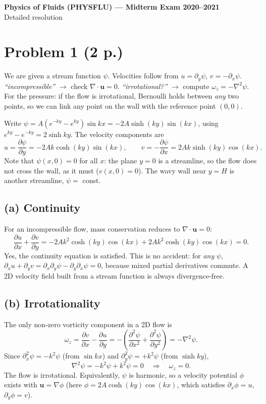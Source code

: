 \documentclass[11pt]{article}
\newcommand{\pd}{\partial}
\newcommand{\bu}{\mathbf u}
\newcommand{\kw}[1]{{\color{kw}\itshape ``#1''}}
\begin{document}
\begin{center}
{\color{hd}\Large\bfseries Physics of Fluids (PHYSFLU) --- Midterm Exam 2020--2021}\\[3pt]
Detailed resolution
\end{center}

\section*{Problem 1 \normalsize(2 p.)}

\begin{strategy}
We are given a stream function $\psi$. Velocities follow from $u=\pd_y\psi$, $v=-\pd_x\psi$.
\kw{incompressible} $\to$ check $\nabla\!\cdot\bu=0$. \kw{irrotational?} $\to$ compute $\omega_z=-\nabla^2\psi$.
For the pressure: if the flow is irrotational, Bernoulli holds between \emph{any} two points, so we can link any point on the wall with the reference point $(0,0)$.
\end{strategy}

Write $\psi=A\left(e^{-ky}-e^{ky}\right)\sin kx=-2A\sinh(ky)\sin(kx)$, using $e^{ky}-e^{-ky}=2\sinh ky$. The velocity components are
\[
u=\frac{\pd\psi}{\pd y}=-2Ak\cosh(ky)\sin(kx),\qquad
v=-\frac{\pd\psi}{\pd x}=2Ak\sinh(ky)\cos(kx).
\]
Note that $\psi(x,0)=0$ for all $x$: the plane $y=0$ is a streamline, so the flow does not cross the wall, as it must ($v(x,0)=0$). The wavy wall near $y=H$ is another streamline, $\psi=$ const.

\subsection*{(a) Continuity}
For an incompressible flow, mass conservation reduces to $\nabla\!\cdot\bu=0$:
\[
\frac{\pd u}{\pd x}+\frac{\pd v}{\pd y}
=-2Ak^2\cosh(ky)\cos(kx)+2Ak^2\cosh(ky)\cos(kx)=0 .
\]
Yes, the continuity equation is satisfied. This is no accident: for \emph{any} $\psi$, $\pd_xu+\pd_yv=\pd_x\pd_y\psi-\pd_y\pd_x\psi=0$, because mixed partial derivatives commute. A 2D velocity field built from a stream function is always divergence-free.

\subsection*{(b) Irrotationality}
The only non-zero vorticity component in a 2D flow is
\[
\omega_z=\frac{\pd v}{\pd x}-\frac{\pd u}{\pd y}=-\left(\frac{\pd^2\psi}{\pd x^2}+\frac{\pd^2\psi}{\pd y^2}\right)=-\nabla^2\psi .
\]
Since $\pd_x^2\psi=-k^2\psi$ (from $\sin kx$) and $\pd_y^2\psi=+k^2\psi$ (from $\sinh ky$),
\[
\nabla^2\psi=-k^2\psi+k^2\psi=0\quad\Longrightarrow\quad\omega_z=0 .
\]
The flow is irrotational. Equivalently, $\psi$ is harmonic, so a velocity potential $\phi$ exists with $\bu=\nabla\phi$ (here $\phi=2A\cosh(ky)\cos(kx)$, which satisfies $\pd_x\phi=u$, $\pd_y\phi=v$).
\end{document}
